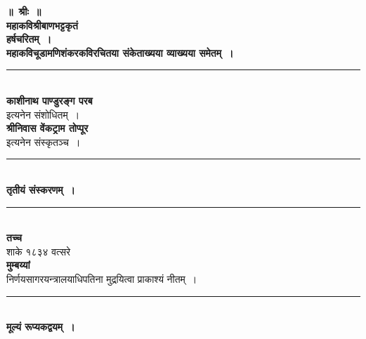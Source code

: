 \documentclass[11pt, openany]{book}
\begin{document}
\newpage
\begin{center}
\doublespacing

\textbf{॥~श्रीः~॥}\\

\vspace{3mm}
\textbf{\Large महाकविश्रीबाणभट्टकृतं}\\

\vspace{5mm}
\textbf{\huge हर्षचरितम्~।}\\

\vspace{3mm}
\textbf{महाकविचूडामणिशंकरकविरचितया संकेताख्यया व्याख्यया समेतम्~।}\\

\rule{0.4\linewidth}{0.5pt}\\

\vspace{3mm}
\textbf{\Large काशीनाथ पाण्डुरङ्ग परब}\\

{\large इत्यनेन संशोधितम्~।}\\

\vspace{3mm}
\textbf{\Large श्रीनिवास वेंकट्राम तोप्पूर}\\

{\large इत्यनेन संस्कृतञ्च~।}\\

\vspace{3mm}
\rule{0.2\linewidth}{0.5pt}\\

\textbf{तृतीयं संस्करणम्~।}\\

\rule{0.2\linewidth}{0.5pt}\\

\vspace{3mm}
\textbf{तच्च}\\

शाके १८३४ वत्सरे\\

\vspace{3mm}
\textbf{\large मुम्बय्यां}\\

\vspace{3mm}
निर्णयसागरयन्त्रालयाधिपतिना मुद्रयित्वा प्राकाश्यं नीतम्~।\\

\rule{0.3\linewidth}{0.5pt}\\

\vspace{3mm}
\textbf{\large मूल्यं रूप्यकद्वयम्~।}
\end{center}
\end{document}
